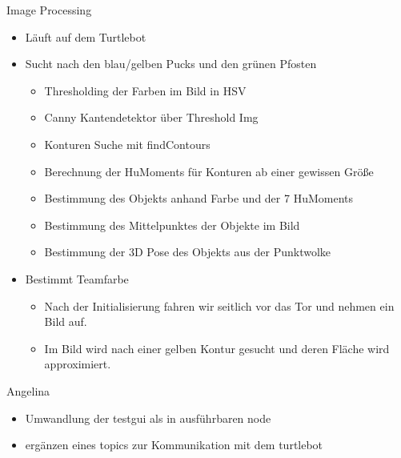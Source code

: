 \begin{frame}{Image Processing}

\begin{itemize}
\item
  Läuft auf dem Turtlebot
\item
  Sucht nach den blau/gelben Pucks und den grünen Pfosten

  \begin{itemize}
  \item
    Thresholding der Farben im Bild in HSV
  \item
    Canny Kantendetektor über Threshold Img
  \item
    Konturen Suche mit findContours
  \item
    Berechnung der HuMoments für Konturen ab einer gewissen Größe
  \item
    Bestimmung des Objekts anhand Farbe und der 7 HuMoments
  \item
    Bestimmung des Mittelpunktes der Objekte im Bild
  \item
    Bestimmung der 3D Pose des Objekts aus der Punktwolke
  \end{itemize}
\item
  Bestimmt Teamfarbe

  \begin{itemize}
  \item
    Nach der Initialisierung fahren wir seitlich vor das Tor und nehmen
    ein Bild auf.
  \item
    Im Bild wird nach einer gelben Kontur gesucht und deren Fläche wird
    approximiert.
  \end{itemize}
\end{itemize}

\end{frame}

\begin{frame}{Angelina}

\begin{itemize}
\item
  Umwandlung der testgui als in ausführbaren node
\item
  ergänzen eines topics zur Kommunikation mit dem turtlebot
\end{itemize}

\end{frame}
